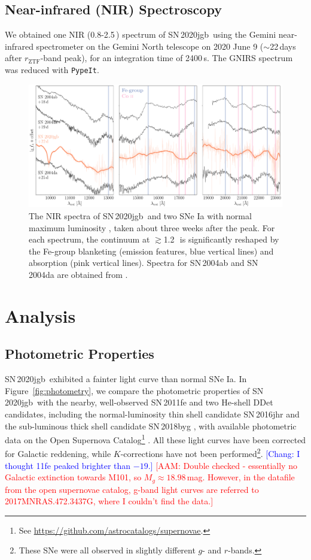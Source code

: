 \documentclass[twocolumn]{aastex631}
\newcommand{\sn}{SN\,2020jgb}
\newcommand{\adam}[1]{\textcolor{red}{[AAM: #1]}}
\newcommand{\chang}[1]{\textcolor{blue}{[Chang: #1]}}
\begin{document}
\subsection{Near-infrared (NIR) Spectroscopy}
We obtained one NIR (0.8-2.5\,\micron) spectrum of \sn\ using the Gemini near-infrared spectrometer \citep[GNIRS;][]{GNIRS1998} on the Gemini North telescope on 2020 June 9 ($\sim$22\,days after $r_\mathrm{ZTF}$-band peak), for an integration time of 2400\,s. The GNIRS spectrum was reduced with \texttt{PypeIt}.

\begin{figure}
    \centering
    \includegraphics[width=\textwidth]{NIR_spec.pdf}
    \caption{The NIR spectra of \sn\ and two SNe Ia with normal maximum luminosity \citep[SN\,2004ab and SN\,2004da,][]{Marion2009_NIR}, taken about three weeks after the peak. For each spectrum, the continuum at $\gtrsim$1.2\,\micron\ is significantly reshaped by the Fe-group blanketing (emission features, blue vertical lines) and  absorption (pink vertical lines). Spectra for SN\,2004ab and SN\,2004da are obtained from \citet{Marion2009_NIR}.}
    \label{fig:NIR_spec}
\end{figure}

\section{Analysis} \label{sec:analysis}
\subsection{Photometric Properties}
\sn\ exhibited a fainter light curve than normal SNe Ia. In Figure~\ref{fig:photometry}, we compare the photometric properties of \sn\ with the nearby, well-observed SN\,2011fe \citep{Nugent_11fe_2011} and two He-shell DDet candidates, including the normal-luminosity thin shell candidate SN\,2016jhr \citep{jiang_16jhr_2017} and the sub-luminous thick shell candidate SN\,2018byg \citep{de_18byg_2019}, with available photometric data on the Open Supernova Catalog\footnote{See \url{https://github.com/astrocatalogs/supernovae}.} \citep{Guillochon_2017}. All these light curves have been corrected for Galactic reddening, while $K$-corrections have not been performed\footnote{These SNe were all observed in slightly different $g$- and $r$-bands.}. \chang{I thought 11fe peaked brighter than $-19$.} \adam{Double checked - essentially no Galactic extinction towards M101, so $M_g\approx18.98$\,mag. However, in the datafile from the open supernovae catalog, g-band light curves are referred to 2017MNRAS.472.3437G, where I couldn't find the data.}
\end{document}
